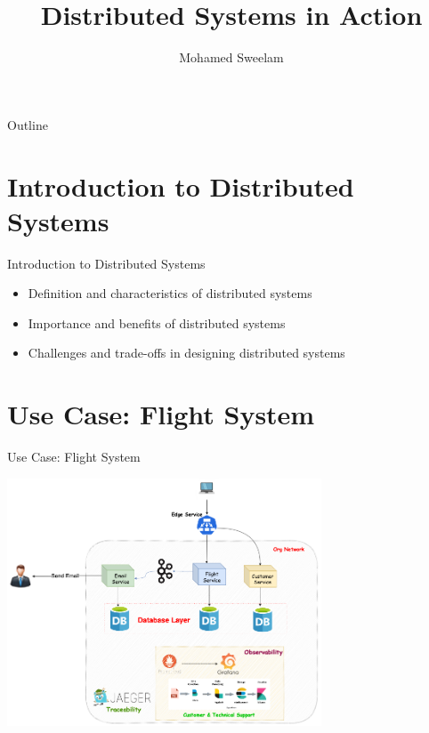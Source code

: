 \documentclass{beamer}
\title{Distributed Systems in Action}
\author{Mohamed Sweelam}
\institute{Software Engineer}
\date{}
\begin{document}
\begin{frame}
  \titlepage
\end{frame}

\begin{frame}{Outline}
  \tableofcontents
\end{frame}

\section{Introduction to Distributed Systems}
\begin{frame}{Introduction to Distributed Systems}
  \begin{itemize}
    \item Definition and characteristics of distributed systems
    \item Importance and benefits of distributed systems
    \item Challenges and trade-offs in designing distributed systems
  \end{itemize}
\end{frame}

\section{Use Case: Flight System}
\begin{frame}{Use Case: Flight System}
  \begin{center}
    \includegraphics[width=0.7\textwidth]{img/system-HLD-1.png}
  \end{center}
\end{frame}
\end{document}
